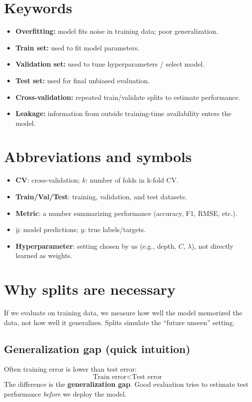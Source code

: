\documentclass[11pt]{article}
\begin{document}
\section{Keywords}
\begin{itemize}[leftmargin=*]
  \item \textbf{Overfitting:} model fits noise in training data; poor generalization.
  \item \textbf{Train set:} used to fit model parameters.
  \item \textbf{Validation set:} used to tune hyperparameters / select model.
  \item \textbf{Test set:} used for final unbiased evaluation.
  \item \textbf{Cross-validation:} repeated train/validate splits to estimate performance.
  \item \textbf{Leakage:} information from outside training-time availability enters the model.
\end{itemize}

\section{Abbreviations and symbols}
\begin{itemize}[leftmargin=*]
  \item \textbf{CV}: cross-validation; $k$: number of folds in k-fold CV.
  \item \textbf{Train/Val/Test}: training, validation, and test datasets.
  \item \textbf{Metric}: a number summarizing performance (accuracy, F1, RMSE, etc.).
  \item $\hat{y}$: model predictions; $y$: true labels/targets.
  \item \textbf{Hyperparameter}: setting chosen by us (e.g., depth, $C$, $\lambda$), not directly learned as weights.
\end{itemize}

\section{Why splits are necessary}
If we evaluate on training data, we measure how well the model memorized the data, not how well it generalizes.
Splits simulate the ``future unseen'' setting.

\subsection{Generalization gap (quick intuition)}
Often training error is lower than test error:
\[
  \text{Train error} < \text{Test error}
\]
The difference is the \textbf{generalization gap}. Good evaluation tries to estimate test performance \emph{before} we deploy the model.
\end{document}
